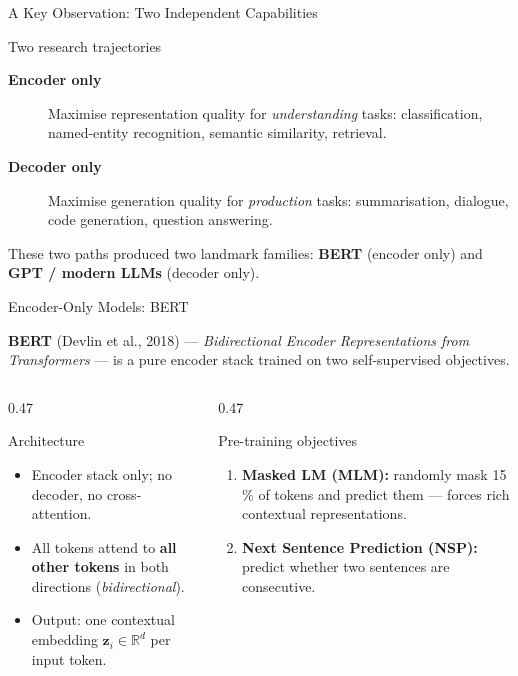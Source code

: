 \documentclass[aspectratio=169]{beamer}
\begin{document}
\begin{frame}{A Key Observation: Two Independent Capabilities}
\begin{exampleblock}{Two research trajectories}
  \begin{description}
    \item[\textbf{Encoder only}]
          Maximise representation quality for \emph{understanding}
          tasks: classification, named-entity recognition,
          semantic similarity, retrieval.
    \item[\textbf{Decoder only}]
          Maximise generation quality for \emph{production}
          tasks: summarisation, dialogue, code generation,
          question answering.
  \end{description}
\end{exampleblock}

\medskip
These two paths produced two landmark families:
\textbf{BERT} (encoder only) and \textbf{GPT / modern LLMs}
(decoder only).

\end{frame}
%
%
\begin{frame}{Encoder-Only Models: BERT}

\textbf{BERT} (Devlin et al., 2018) --- \emph{Bidirectional Encoder
Representations from Transformers} --- is a pure encoder stack
trained on two self-supervised objectives.

\begin{columns}[T]
  \begin{column}{0.47\textwidth}
    \begin{block}{Architecture}
      \begin{itemize}
        \item Encoder stack only; no decoder, no cross-attention.
        \item All tokens attend to \textbf{all other tokens} in
              both directions (\emph{bidirectional}).
        \item Output: one contextual embedding
              $\mathbf{z}_i \in \mathbb{R}^d$ per input token.
      \end{itemize}
    \end{block}
  \end{column}

  \begin{column}{0.47\textwidth}
    \begin{block}{Pre-training objectives}
      \begin{enumerate}
        \item \textbf{Masked LM (MLM):} randomly mask 15\,\%
              of tokens and predict them --- forces rich contextual
              representations.
        \item \textbf{Next Sentence Prediction (NSP):}
              predict whether two sentences are consecutive.
      \end{enumerate}
    \end{block}
  \end{column}
\end{columns}
\end{frame}
\end{document}

